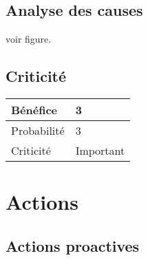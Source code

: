 \subsection*{Analyse des causes}
	voir figure.

\subsection*{Criticité}

\begin{table}[h]
\centering
	\begin{tabularx}{12.8cm}{|>{
	}X|X|}
	\hline
	Bénéfice & 3\\
	\hline
	Probabilité & 3\\
	\hline
	Criticité & Important\\
	\hline
	\end{tabularx}
\end{table}
\newpage

\section*{Actions}
\subsection*{Actions proactives}

